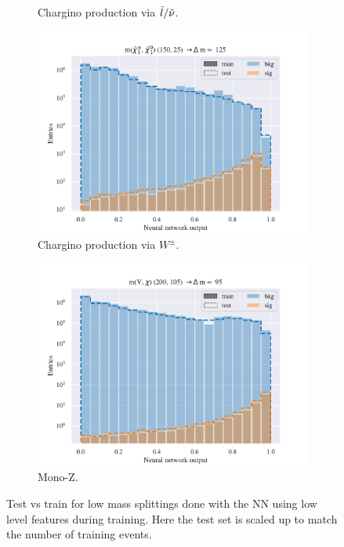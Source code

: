 \begin{figure}[H]
\begin{subfigure}[t!]{0.49\textwidth}
        \caption{Chargino production via $\Tilde{l}/\Tilde{\nu}$.}
        \label{fig:}
    \end{subfigure}    
    \begin{subfigure}[t!]{0.49\textwidth}
        \includegraphics[width = \textwidth]{Figures/WW/NN/Low_level/Low/scaled_train_test_395268.pdf}
        \caption{Chargino production via $W^\pm$.}
        \label{fig:}
    \end{subfigure}
    \begin{subfigure}[t!]{0.49\textwidth}
        \includegraphics[width = \textwidth]{Figures/Mono_Z/ML/NN/Low_level/Low/scaled_train_test_310604.pdf}
        \caption{Mono-Z.}
        \label{fig:}
    \end{subfigure}
    \caption{Test vs train for low mass splittings done with the NN using low level features during training. Here the test set is scaled up to match the number of training events.}
    \label{fig:}
\end{figure}


